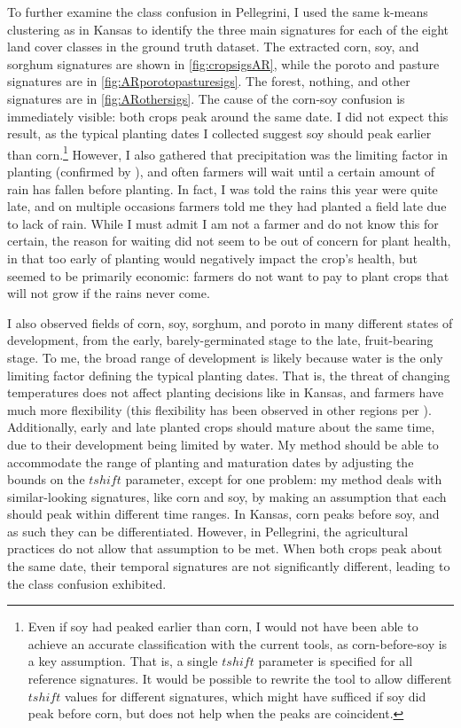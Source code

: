 To further examine the class confusion in Pellegrini, I used the same k-means clustering as in Kansas to identify the three main signatures for each of the eight land cover classes in the ground truth dataset. The extracted corn, soy, and sorghum signatures are shown in \autoref{fig:cropsigsAR}, while the poroto and pasture signatures are in \autoref{fig:ARporotopasturesigs}. The forest, nothing, and other signatures are in \autoref{fig:ARothersigs}. The cause of the corn-soy confusion is immediately visible: both crops peak around the same date. I did not expect this result, as the typical planting dates I collected suggest soy should peak earlier than corn.\footnote{Even if soy had peaked earlier than corn, I would not have been able to achieve an accurate classification with the current tools, as corn-before-soy is a key assumption. That is, a single $tshift$ parameter is specified for all reference signatures. It would be possible to rewrite the tool to allow different $tshift$ values for different signatures, which might have sufficed if soy did peak before corn, but does not help when the peaks are coincident.} However, I also gathered that precipitation was the limiting factor in planting (confirmed by \autocite{sacks2010crop}), and often farmers will wait until a certain amount of rain has fallen before planting. In fact, I was told the rains this year were quite late, and on multiple occasions farmers told me they had planted a field late due to lack of rain. While I must admit I am not a farmer and do not know this for certain, the reason for waiting did not seem to be out of concern for plant health, in that too early of planting would negatively impact the crop's health, but seemed to be primarily economic: farmers do not want to pay to plant crops that will not grow if the rains never come.

I also observed fields of corn, soy, sorghum, and poroto in many different states of development, from the early, barely-germinated stage to the late, fruit-bearing stage. To me, the broad range of development is likely because water is the only limiting factor defining the typical planting dates. That is, the threat of changing temperatures does not affect planting decisions like in Kansas, and farmers have much more flexibility (this flexibility has been observed in other regions per \textcite{sacks2010crop}). Additionally, early and late planted crops should mature about the same time, due to their development being limited by water. My method should be able to accommodate the range of planting and maturation dates by adjusting the bounds on the $tshift$ parameter, except for one problem: my method deals with similar-looking signatures, like corn and soy, by making an assumption that each should peak within different time ranges. In Kansas, corn peaks before soy, and as such they can be differentiated. However, in Pellegrini, the agricultural practices do not allow that assumption to be met. When both crops peak about the same date, their temporal signatures are not significantly different, leading to the class confusion exhibited.

